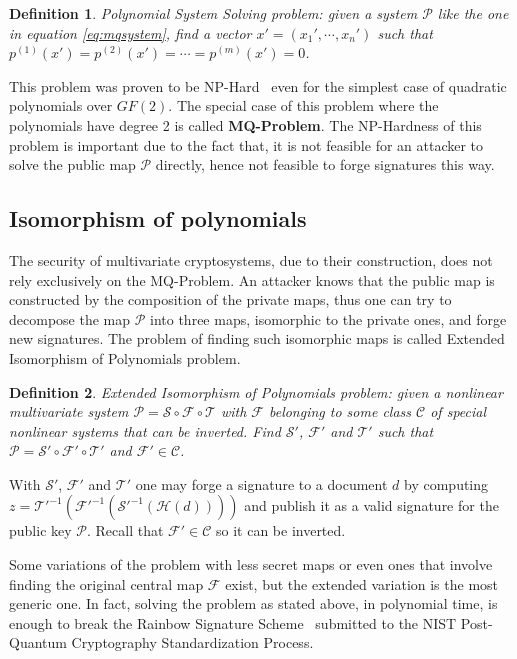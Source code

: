 \documentclass{ufsctex/ufsctex}
\newtheorem{definition}{Definition}
\begin{document}
\begin{definition}
Polynomial System Solving problem: given a system $\mathcal{P}$ like the one in
equation \ref{eq:mqsystem}, find a vector $x' = (x_1',\cdots,x_n')$ such that
$p^{(1)}(x') = p^{(2)}(x') = \cdots = p^{(m)}(x') = 0$.
\end{definition}

This problem was proven to be NP-Hard~\cite[Appendix A7.2]{garey1990npc} even
for the simplest case of quadratic polynomials over $GF(2)$. The special case
of this problem where the polynomials have degree 2 is called
\textbf{MQ-Problem}. The NP-Hardness of this problem is important due to the
fact that, it is not feasible for an attacker to solve the public map
$\mathcal{P}$ directly, hence not feasible to forge signatures this way.

\subsection{Isomorphism of polynomials}

The security of multivariate cryptosystems, due to their construction, does not
rely exclusively on the MQ-Problem. An attacker knows that the public map is
constructed by the composition of the private maps, thus one can try to
decompose the map $\mathcal{P}$ into three maps, isomorphic to the private
ones, and forge new signatures. The problem of finding such isomorphic maps is
called Extended Isomorphism of Polynomials problem.

\begin{definition}
Extended Isomorphism of Polynomials problem: given a nonlinear multivariate
system $\mathcal{P} = \mathcal{S} \circ \mathcal{F} \circ \mathcal{T}$ with
$\mathcal{F}$ belonging to some class $\mathcal{C}$ of special nonlinear
systems that can be inverted. Find $\mathcal{S}'$, $\mathcal{F}'$ and
$\mathcal{T}'$ such that $\mathcal{P} = \mathcal{S}' \circ \mathcal{F}' \circ
\mathcal{T}'$ and $\mathcal{F}' \in \mathcal{C}$.
\end{definition}

With $\mathcal{S}'$, $\mathcal{F}'$ and $\mathcal{T}'$ one may forge a
signature to a document $d$ by computing $z =
\mathcal{T}'^{-1}(\mathcal{F}'^{-1}(\mathcal{S}'^{-1}(\mathcal{H}(d))))$ and
publish it as a valid signature for the public key $\mathcal{P}$. Recall that
$\mathcal{F}' \in \mathcal{C}$ so it can be inverted.

Some variations of the problem with less secret maps or even ones that involve
finding the original central map $\mathcal{F}$ exist, but the extended
variation is the most generic one. In fact, solving the problem as stated
above, in polynomial time, is enough to break the Rainbow Signature
Scheme~\cite{ding2005rainbow} submitted to the NIST Post-Quantum Cryptography
Standardization Process.
\end{document}
